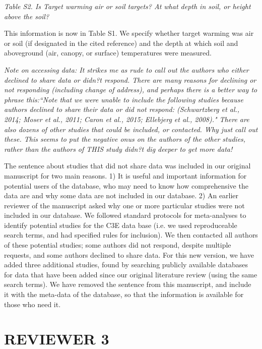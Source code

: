 \documentclass[11pt,a4paper]{letter}
\begin{document}
\begin{letter}{}
\par \emph{Table S2.  Is Target warming air or soil targets?  At what depth in soil, or height above the soil?}

\par This information is now in Table S1. We specify whether target warming was air or soil (if designated in the cited reference) and the depth at which soil and aboveground (air, canopy, or surface) temperatures were measured. 

\par \emph{Note on accessing data:  It strikes me as rude to call out the authors who either declined to share data or didn?t respond.  There are many reasons for declining or not responding (including change of address), and perhaps there is a better way to phrase this:``Note that we were unable to include the following studies because authors declined to share their data or did not respond: (Schwartzberg et al., 2014; Moser et al., 2011; Caron et al., 2015; Ellebjerg et al., 2008)." There are also dozens of other studies that could be included, or contacted.  Why just call out these.  This seems to put the negative onus on the authors of the other studies, rather than the authors of THIS study didn?t dig deeper to get more data!}

\par The sentence about studies that did not share data was included in our original manuscript for two main reasons. 1) It is useful and important information for potential users of the database, who may need to know how comprehensive the data are and why some data are not included in our database. 2) An earlier reviewer of the manuscript asked why one or more particular studies were not included in our database. We followed standard protocols for meta-analyses to identify potential studies for the C3E data base (i.e. we used reproduceable search terms, and had specified rules for inclusion). We then contacted all authors of these potential studies; some authors did not respond, despite multiple requests, and some authors declined to share data.  For this new version, we have added three additional studies, found by searching publicly available databases for data that have been added since our original literature review (using the same search terms). We have removed the sentence from this manuscript, and include it with the meta-data of the database, so that the information is available for those who need it.

\section {REVIEWER 3}


\end{letter}
\end{document}
